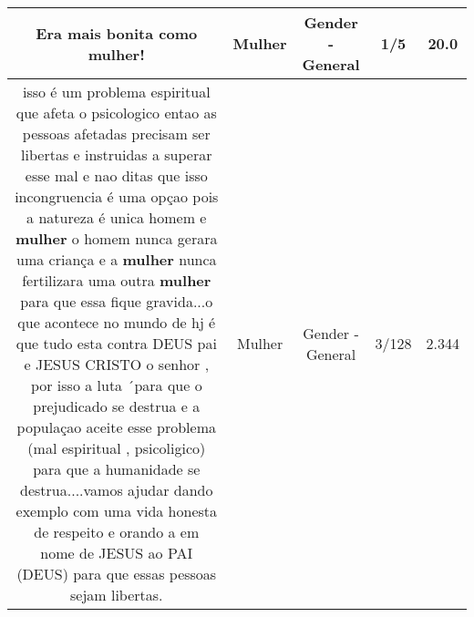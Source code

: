 \documentclass[11pt]{article}
\newlength\mylength
\begin{document}
\begin{center}
\begin{longtable}{|C{.65\mylength}|C{.30\mylength}|C{.12\mylength}|C{.12\mylength}|C{.12\mylength}|}
  \small Era mais bonita como \textbf{mulher}!\normalsize   & Mulher & Gender - General & 1/5 & 20.0 \\  \hline
  \small isso é um problema espiritual que afeta o psicologico  entao as pessoas afetadas precisam ser libertas e instruidas a superar esse mal e nao ditas que isso incongruencia é uma opçao pois a natureza é unica homem e \textbf{mulher} o homem nunca gerara uma criança e a \textbf{mulher} nunca fertilizara uma outra \textbf{mulher} para que essa fique gravida...o que acontece no mundo de hj é que tudo esta contra DEUS pai e JESUS CRISTO o senhor , por isso a luta ´para que o prejudicado se destrua e a populaçao aceite esse problema (mal espiritual , psicoligico) para que a humanidade se destrua....vamos ajudar dando exemplo com uma vida honesta de respeito e orando a em nome de JESUS ao PAI (DEUS) para que essas pessoas sejam libertas.\normalsize   & Mulher & Gender - General & 3/128 & 2.344 \\  \hline

\end{longtable}
\end{center}
\end{document}

